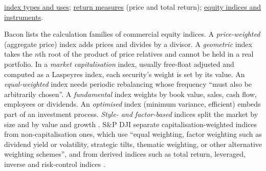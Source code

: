 \begin{qfmethod}
 \hyperref[def:equity-fixed-income-index-types]{index types and uses}; \hyperref[def:return-measures]{return measures} (price and total return); \hyperref[def:equity-indices-derivatives]{equity indices and instruments}.

\end{qfmethod}

\begin{qfdefinition}\label{def:equity-fixed-income-index-types}
 Bacon lists the calculation families of commercial equity indices. A \emph{price-weighted} (aggregate price) index adds prices and divides by a divisor. A \emph{geometric} index takes the $n$th root of the product of price relatives and cannot be held in a real portfolio. In a \emph{market capitalisation} index, usually free-float adjusted and computed as a Laspeyres index, each security's weight is set by its value. An \emph{equal-weighted} index needs periodic rebalancing whose frequency ``must also be arbitrarily chosen''. A \emph{fundamental} index weights by book value, sales, cash flow, employees or dividends. An \emph{optimised} index (minimum variance, efficient) embeds part of an investment process. \emph{Style- and factor-based} indices split the market by size and by value and growth \citep[3rd ed., 2023, chap.~4, pp.~105--111]{wide-bacon-attribution}. S\&P DJI separate capitalisation-weighted indices from non-capitalisation ones, which use ``equal weighting, factor weighting such as dividend yield or volatility, strategic tilts, thematic weighting, or other alternative weighting schemes'', and from derived indices such as total return, leveraged, inverse and risk-control indices \citep[p.~4]{index-mathematics-methodology-2026}.


\end{qfdefinition}
